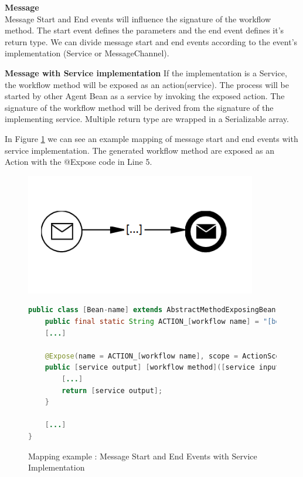 \textbf{Message}\\
Message Start and End events will influence the signature of the workflow method. The start event defines the parameters and the end event defines it's return type. We can divide message start and end events according to the event's implementation (Service or MessageChannel). 

\textbf{Message with Service implementation}
If the implementation is a Service, the workflow method will be exposed as an action(service). The process will be started by other Agent Bean as a service by invoking the exposed action. The signature of the workflow method will be derived from the signature of the implementing service. 
Multiple return type are wrapped in a Serializable array. 

In Figure \ref{fig:message_service} we can see an example mapping of message start and end events with service implementation. The generated workflow method are exposed as an Action with the @Expose code in Line 5. 
\begin{figure}[h]
\begin{minipage}[c]{0.35\textwidth}
\includegraphics[width=0.9\textwidth]{images/mapping/messageStart.png}
\end{minipage}
\begin{minipage}[c]{0.65\textwidth}
\begin{lstlisting}[language = Java]
public class [Bean-name] extends AbstractMethodExposingBean{
	public final static String ACTION_[workflow name] = "[bean fullname]#[workflow method]"; 
	[...]
	
	@Expose(name = ACTION_[workflow name], scope = ActionScope.GLOBAL)
	public [service output] [workflow method]([service inputs]){
		[...]
		return [service output];
	}
	
	[...]
}
\end{lstlisting}
\end{minipage}
\caption{Mapping example : Message Start and End Events with Service Implementation}%
\label{fig:message_service}
\end{figure}

